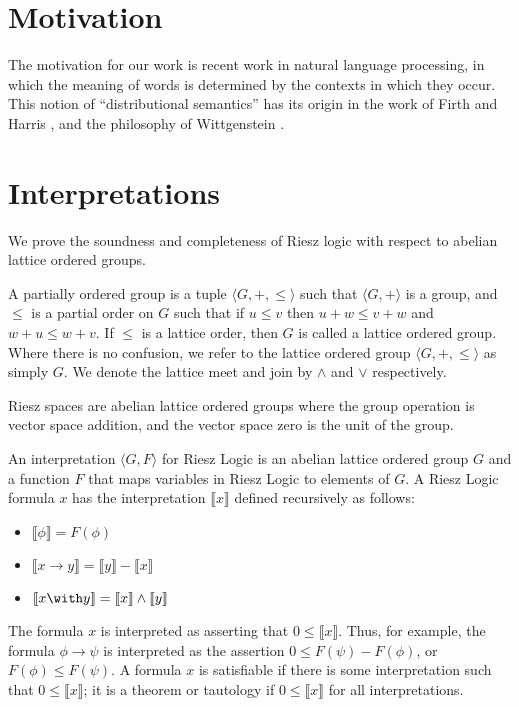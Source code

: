 \documentclass[preprint,leqno]{elsarticle}
\newcommand{\interp}[1]{\llbracket #1 \rrbracket}
\begin{document}

\section{Motivation}

The motivation for our work is recent work in natural language
processing, in which the meaning of words is determined by the
contexts in which they occur. This notion of ``distributional
semantics'' has its origin in the work of Firth \cite{Firth:57} and
Harris \cite{Harris:68}, and the philosophy of Wittgenstein
\cite{Wittgenstein:53}.

\section{Interpretations}

We prove the soundness and completeness of Riesz logic with respect to
abelian lattice ordered groups.

\begin{definition}
  A partially ordered group is a tuple $\langle G, +, \le\rangle$ such
  that $\langle G, +\rangle$ is a group, and $\le$ is a partial order
  on $G$ such that if $u \le v$ then $u + w \le v + w$ and $w + u \le
  w + v$. If $\le$ is a lattice order, then $G$ is called a lattice
  ordered group. Where there is no confusion, we refer to the lattice
  ordered group $\langle G, +, \le\rangle$ as simply $G$. We denote
  the lattice meet and join by $\land$ and $\lor$ respectively.
\end{definition}

Riesz spaces are abelian lattice ordered groups where the group
operation is vector space addition, and the vector space zero is the
unit of the group.

An interpretation $\langle G, F\rangle$ for Riesz Logic
is an abelian lattice ordered group $G$ and a function $F$ that maps
variables in Riesz Logic to elements of $G$. A Riesz Logic formula $x$
has the interpretation $\interp{x}$ defined recursively as follows:
\begin{itemize}
\item $\interp{\phi} = F(\phi)$
\item $\interp{x \rightarrow y} = \interp{y} - \interp{x}$
\item $\interp{x \with y} = \interp{x} \land \interp{y}$
\end{itemize}
The formula $x$ is interpreted as asserting that $0 \le
\interp{x}$. Thus, for example, the formula $\phi \rightarrow \psi$ is
interpreted as the assertion $0 \le F(\psi) - F(\phi)$, or $F(\phi)
\le F(\psi)$. A formula $x$ is satisfiable if there is some
interpretation such that $0 \le \interp{x}$; it is a theorem or
tautology if $0 \le \interp{x}$ for all interpretations.
\end{document}
